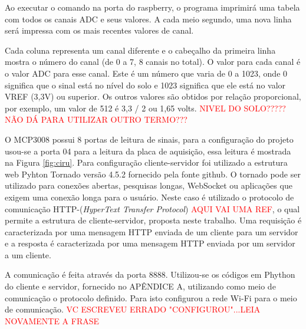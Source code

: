 \documentclass[12pt, a4paper]{article}
\begin{document}
Ao executar o comando na porta do raspberry, o programa imprimirá uma tabela com todos os canais ADC e seus valores. A cada meio segundo, uma nova linha será impressa com os mais recentes valores de canal.

Cada coluna representa um canal diferente e o cabeçalho da primeira linha mostra o número do canal (de 0 a 7, 8 canais no total). O valor para cada canal é o valor ADC para esse canal. Este é um número que varia de 0 a 1023, onde 0 significa que o sinal está no nível do solo e 1023 significa que ele está no valor VREF (3,3V) ou superior. Os outros valores são obtidos por relação proporcional, por exemplo, um valor de 512 é 3,3 / 2 ou 1,65 volts. \textcolor{red}{NIVEL DO SOLO????? NÃO DÁ PARA UTILIZAR OUTRO TERMO???}

O MCP3008 possui 8 portas de leitura de sinais, para a configuração do projeto usou-se a porta 04 para a leitura da placa de aquisição, essa leitura é mostrada na Figura \ref{fig:ciru}. Para configuração cliente-servidor foi utilizado a estrutura web Pyhton Tornado versão 4.5.2 fornecido pela fonte github. O tornado pode ser utilizado para conexões abertas, pesquisas longas, WebSocket ou aplicações que exigem uma conexão longa para o usuário. Neste caso é utilizado o protocolo de comunicação HTTP-(\textit{HyperText Transfer Protocol}) \textcolor{red}{AQUI VAI UMA REF}, o qual permite a estrutura de cliente-servidor, proposta neste trabalho. Uma requisição é caracterizada por uma mensagem HTTP enviada de um cliente para um servidor e a resposta é caracterizada por uma mensagem HTTP enviada por um servidor a um cliente.

A comunicação é feita através da porta 8888. Utilizou-se os códigos em Phython do cliente e servidor, fornecido no APÊNDICE A, utilizando como meio de comunicação o protocolo definido. Para isto configurou a rede Wi-Fi para o meio de comunicação. \textcolor{red}{VC ESCREVEU ERRADO "CONFIGUROU"...LEIA NOVAMENTE A FRASE}  
\end{document}
